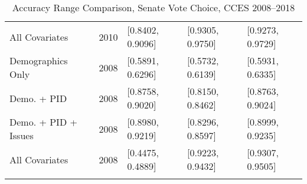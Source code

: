\begin{longtable}{lrlll}
  All Covariates & 2010 & [0.8402, 0.9096] & [0.9305, 0.9750] & [0.9273, 0.9729] \\ 
  Demographics Only & 2008 & [0.5891, 0.6296] & [0.5732, 0.6139] & [0.5931, 0.6335] \\ 
  Demo. + PID & 2008 & [0.8758, 0.9020] & [0.8150, 0.8462] & [0.8763, 0.9024] \\ 
  Demo. + PID + Issues & 2008 & [0.8980, 0.9219] & [0.8296, 0.8597] & [0.8999, 0.9235] \\ 
  All Covariates & 2008 & [0.4475, 0.4889] & [0.9223, 0.9432] & [0.9307, 0.9505] \\ 
   \bottomrule
\caption{Accuracy Range Comparison, Senate Vote Choice, CCES 2008--2018} 
\label{tab:CCES_4_accuracy}
\end{longtable}
